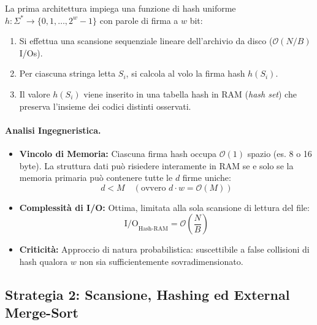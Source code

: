 La prima architettura impiega una funzione di hash uniforme $h \colon \Sigma^* \to \{0, 1, \dots, 2^w - 1\}$ con parole di firma a $w$ bit:
\begin{enumerate}
  \item Si effettua una scansione sequenziale lineare dell'archivio da disco ($\mathcal{O}(N/B)$ I/Os).
  \item Per ciascuna stringa letta $S_i$, si calcola al volo la firma hash $h(S_i)$.
  \item Il valore $h(S_i)$ viene inserito in una tabella hash in RAM (\textit{hash set}) che preserva l'insieme dei codici distinti osservati.
\end{enumerate}

\paragraph{Analisi Ingegneristica.}
\begin{itemize}
  \item \textbf{Vincolo di Memoria:} Ciascuna firma hash occupa $\mathcal{O}(1)$ spazio (es. 8 o 16 byte). La struttura dati pu\`o risiedere interamente in RAM se e solo se la memoria primaria pu\`o contenere tutte le $d$ firme uniche:
  \begin{equation}
    d < M \quad (\text{ovvero } d \cdot w = \mathcal{O}(M))
  \end{equation}
  \item \textbf{Complessità di I/O:} Ottima, limitata alla sola scansione di lettura del file:
  \begin{equation}
    \text{I/O}_{\text{Hash-RAM}} = \mathcal{O}\left(\frac{N}{B}\right)
  \end{equation}
  \item \textbf{Criticità:} Approccio di natura probabilistica: suscettibile a false collisioni di hash qualora $w$ non sia sufficientemente sovradimensionato.
\end{itemize}

\FloatBarrier
\subsection{Strategia 2: Scansione, Hashing ed External Merge-Sort}
\label{subsec:soluzione-2-external-sort-hash}

